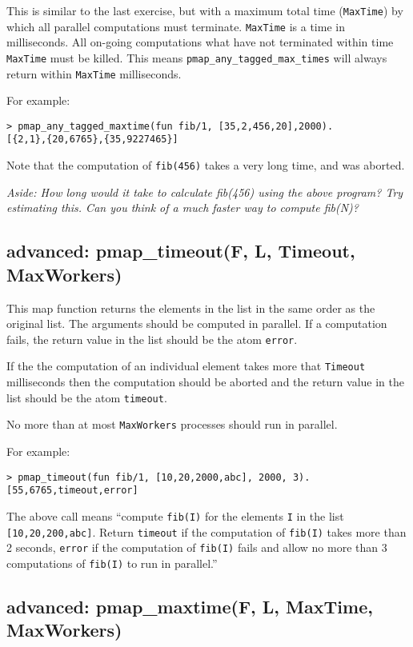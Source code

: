 \documentclass[12pt]{hitec}
\begin{document}
This is similar to the last exercise, but with a maximum total time
(\verb+MaxTime+) by which all parallel computations must
terminate. \verb+MaxTime+ is a time in milliseconds.  All on-going
computations what have not terminated within time \verb+MaxTime+ must
be killed. This means \verb+pmap_any_tagged_max_times+ will always
return within \verb+MaxTime+ milliseconds.

For example:

\begin{Verbatim}
> pmap_any_tagged_maxtime(fun fib/1, [35,2,456,20],2000).
[{2,1},{20,6765},{35,9227465}]
\end{Verbatim}

Note that the computation of \verb+fib(456)+ takes a very long time,
and was aborted.

{\sl Aside: How long would it take to calculate fib(456) using the above program?
Try estimating this. Can you think of a much faster way to compute fib(N)?}

\subsection{advanced: pmap\_timeout(F, L, Timeout, MaxWorkers)}

This map function returns the elements in the list in the same order
as the original list. The arguments should be computed in parallel. If
a computation fails, the return value in the list should be the atom
\verb+error+.

If the the computation of an individual element takes more that
\verb+Timeout+ milliseconds then the computation should be aborted and
the return value in the list should be the atom \verb+timeout+.

No more than at most \verb+MaxWorkers+ processes should run in parallel.

For example:

\begin{Verbatim}
> pmap_timeout(fun fib/1, [10,20,2000,abc], 2000, 3).
[55,6765,timeout,error]
\end{Verbatim}

The above call means ``compute \verb+fib(I)+ for the elements \verb+I+
in the list \verb+[10,20,200,abc]+. Return \verb+timeout+ if the
computation of \verb+fib(I)+ takes more than 2 seconds, \verb+error+
if the computation of \verb+fib(I)+ fails and allow no more than 3
computations of \verb+fib(I)+ to run in parallel.''

\subsection{advanced: pmap\_maxtime(F, L, MaxTime, MaxWorkers)}
\end{document}
